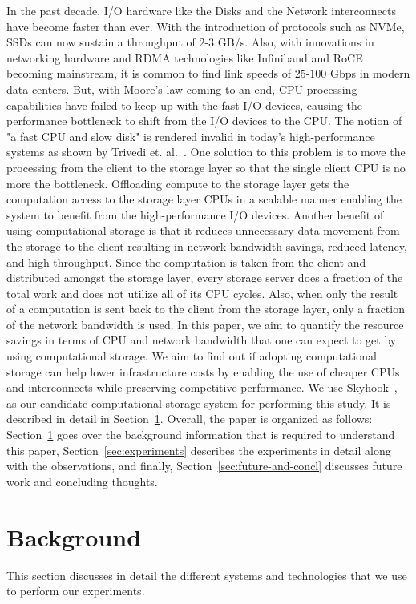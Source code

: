 \documentclass[11pt]{article}
\begin{document}
In the past decade, I/O hardware like the Disks and the Network interconnects have become faster than ever. With the introduction of protocols such as NVMe, SSDs can now sustain a throughput of $2$-$3$ GB/s. Also, with innovations in networking hardware and RDMA technologies like Infiniband and RoCE becoming mainstream, it is common to find link speeds of $25$-$100$ Gbps in modern data centers. But, with Moore's law coming to an end, CPU processing capabilities have failed to keep up with the fast I/O devices, causing the performance bottleneck to shift from the I/O devices to the CPU. The notion of "a fast CPU and slow disk" is rendered invalid in today's high-performance systems as shown by Trivedi et. al.~\cite{trivedi2018albis}. One solution to this problem is to move the processing from the client to the storage layer so that the single client CPU is no more the bottleneck. Offloading compute to the storage layer gets the computation access to the storage layer CPUs in a scalable manner enabling the system to benefit from the high-performance I/O devices. Another benefit of using computational storage is that it reduces unnecessary data movement from the storage to the client resulting in network bandwidth savings, reduced latency, and high throughput. Since the computation is taken from the client and distributed amongst the storage layer, every storage server does a fraction of the total work and does not utilize all of its CPU cycles. Also, when only the result of a computation is sent back to the client from the storage layer, only a fraction of the network bandwidth is used. In this paper, we aim to quantify the resource savings in terms of CPU and network bandwidth that one can expect to get by using computational storage. We aim to find out if adopting computational storage can help lower infrastructure costs by enabling the use of cheaper CPUs and interconnects while preserving competitive performance. We use Skyhook~\cite{jc2022skyhook}, as our candidate computational storage system for performing this study. It is described in detail in Section~\ref{sec:background}. Overall, the paper is organized as follows: Section~\ref{sec:background} goes over the background information that is required to understand this paper, Section~\ref{sec:experiments} describes the experiments in detail along with the observations, and finally, Section~\ref{sec:future-and-concl} discusses future work and concluding thoughts.

\section{Background}
\label{sec:background}
This section discusses in detail the different systems and technologies that we use to perform our experiments.
\end{document}
